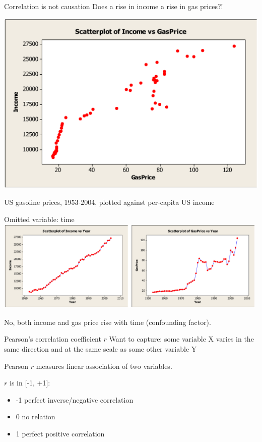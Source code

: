 \documentclass[aspectratio=169,usenames,dvipsnames]{beamer}
\begin{document}
\begin{frame}{Correlation is not causation}
Does a rise in income  a rise in gas prices?!

\includegraphics[height=0.7\textheight]{fig/incomegas}

US gasoline prices, 1953-2004, plotted against per-capita US income
\end{frame}

\begin{frame}{Omitted variable: time}
\includegraphics[width=0.99\textwidth]{fig/incomegastime}

No, both income and gas price rise with time (confounding factor).
\end{frame}


\begin{frame}{Pearson's correlation coefficient $r$}
Want to capture:
some variable X varies in the same direction
and at the same scale as some other variable Y

\vspace{1em}
Pearson $r$ measures linear association of two variables.

$r$ is  in [-1, +1]:

\begin{itemize}
    \item -1 perfect inverse/negative correlation
    \item 0 no  relation
    \item 1 perfect positive correlation
\end{itemize}
\end{frame}
\end{document}
